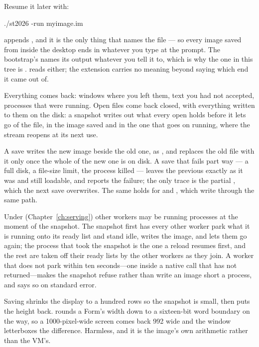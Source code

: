 Resume it later with:

\begin{sh}
./st2026 -run myimage.im
\end{sh}

\begin{stnote}
 appends , and it is the only thing
that names the file --- so every image saved from inside the desktop ends in
 whatever you type at the prompt. The bootstrap's  names its
output whatever you tell it to, which is why the one in this tree is
.  reads either; the extension carries no meaning
beyond saying which end it came out of.
\end{stnote}

Everything comes back: windows where you left them, text you had not accepted,
processes that were running. Open files come back closed, with everything
written to them on the disk: a snapshot writes out what every open
 holds before it lets go of the file, in the image saved and
in the one that goes on running, where the stream reopens at its next use.

A save writes the new image beside the old one, as , and
replaces the old file with it only once the whole of the new one is on disk.
A save that fails part way --- a full disk, a file-size limit, the process
killed --- leaves the previous  exactly as it was and still
loadable, and reports the failure; the only trace is the partial ,
which the next save overwrites. The same holds for  and
, which write through the same path.

\begin{stnote}
Under  (Chapter~\ref{ch:serving}) other workers may be running
processes at the moment of the snapshot. The snapshot first has every other
worker park what it is running onto its ready list and stand idle, writes the
image, and lets them go again; the process that took the snapshot is the one
a reload resumes first, and the rest are taken off their ready lists by the
other workers as they join. A worker that does not park within ten
seconds---one inside a native call that has not returned---makes the snapshot
refuse rather than write an image short a process, and says so on standard
error.
\end{stnote}

\begin{stnote}
Saving shrinks the display to a hundred rows so the snapshot is small, then
puts the height back.  rounds a Form's width down to a
sixteen-bit word boundary on the way, so a 1000-pixel-wide screen comes back
992 wide and the window letterboxes the difference. Harmless, and it is the
image's own arithmetic rather than the VM's.
\end{stnote}

